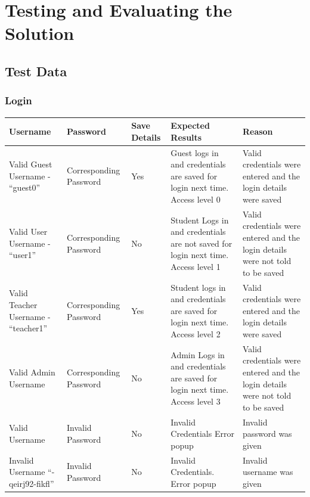 \documentclass[oneside,openany,11pt,a4paper]{report}
\begin{document}
\chapter{Testing and Evaluating the Solution}
\section{Test Data}
\subsection{Login}

\begin{longtable}{|p{3cm}|p{3cm}|p{3cm}|p{3cm}|p{3cm}|}
	\hline
	\rowcolor{gray!50}
	\textbf{Username} & \textbf{Password} & \textbf{Save Details} & \textbf{Expected Results} & \textbf{Reason}\\ \hline
	Valid Guest Username - “guest0” & Corresponding Password & Yes & Guest logs in and credentials are saved for login next time. Access level 0 & Valid credentials were entered and the login details were saved \\ \hline
	
	Valid User Username - “user1” & Corresponding Password & No & Student Logs in and credentials are not saved for login next time. Access level 1 &  Valid credentials were entered and the login details were not told to be saved \\ \hline
	
Valid Teacher Username - “teacher1” & 	Corresponding Password & Yes & Student logs in and credentials are saved for login next time. Access level 2 & Valid credentials were entered and the login details were saved \\ \hline

Valid Admin Username & Corresponding Password & No & Admin Logs in and credentials are saved for login next time. Access level 3 & Valid credentials were entered and the login details were not told to be saved \\ \hline

Valid Username & Invalid Password & No & Invalid Credentials Error popup & Invalid password was given \\ \hline

Invalid Username “-qeirj92-fikfl” & Invalid Password & No & Invalid Credentials. Error popup & Invalid username was given \\ \hline
	
\end{longtable}
\end{document}
